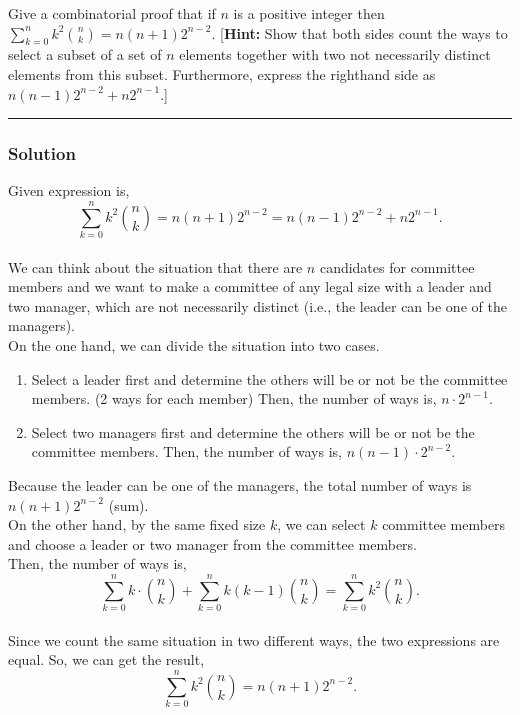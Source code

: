 \newpage
\begin{question}
Give a combinatorial proof that if $n$ is a positive integer then $\sum_{k=0}^{n}k^{2}\binom{n}{k} = n(n+1)2^{n-2}$. [\textbf{Hint:} Show that both sides count the ways to select a subset of a set of $n$ elements together with two not necessarily distinct elements from this subset. Furthermore, express the righthand side as $n(n-1)2^{n-2} + n2^{n-1}$.]
\end{question}

\par\noindent\rule{\textwidth}{0.5pt}

\subsubsection*{Solution}

Given expression is, $$\sum_{k=0}^{n}k^{2}\binom{n}{k} = n(n+1)2^{n-2} = n(n-1)2^{n-2} + n 2^{n-1}.$$\\
We can think about the situation that there are $n$ candidates for committee members and we want to make a committee of any legal size with a leader and two manager, which are not necessarily distinct (i.e., the leader can be one of the managers).\\
On the one hand, we can divide the situation into two cases.
\begin{enumerate}
    \item Select a leader first and determine the others will be or not be the committee members. (2 ways for each member) Then, the number of ways is, $n \cdot 2^{n-1}$.
    \item Select two managers first and determine the others will be or not be the committee members. Then, the number of ways is, $n(n-1)\cdot 2^{n-2}$.
\end{enumerate}
Because the leader can be one of the managers, the total number of ways is $n(n+1)2^{n-2}$ (sum).\\
On the other hand, by the same fixed size $k$, we can select $k$ committee members and choose a leader or two manager from the committee members.\\
Then, the number of ways is, $$\displaystyle\sum_{k=0}^n k \cdot \binom n k + \sum_{k=0}^{n}k(k-1)\binom{n}{k} = \sum_{k=0}^{n}k^2\binom{n}{k}.$$\\
Since we count the same situation in two different ways, the two expressions are equal. So, we can get the result, $$\sum_{k=0}^{n}k^{2}\binom{n}{k} = n(n+1)2^{n-2}.$$

